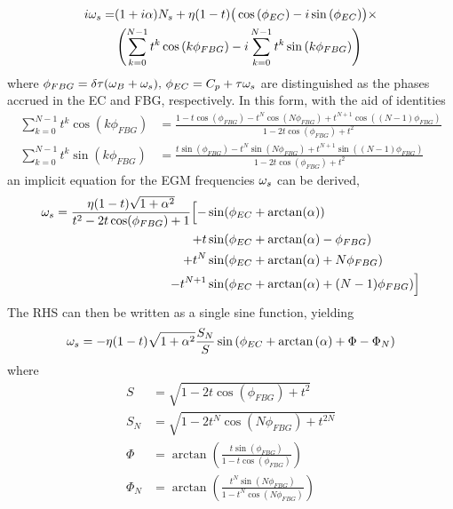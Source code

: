 %
\begin{align*}
    i \omega_s = &(1+i \alpha) N_s + \eta (1-t) \big(\cos{(\phi_{EC})} -i\sin{(\phi_{EC})}  \big) \times \\ 
             &\left( \sum_{k=0}^{N-1} t^k \cos{(k\phi_{FBG})} - i \sum_{k=0}^{N-1} t^k \sin{(k\phi_{FBG})} \right)
\end{align*}
%
where $\phi_{FBG} = \delta \tau(\omega_B + \omega_s), \, \phi_{EC} = C_p+\tau \omega_s$ are distinguished as the phases accrued in the EC and FBG, respectively. In this form, with the aid of identities
%
\begin{align*}
    \sum_{k=0}^{N-1} t^k \cos(k\phi_{FBG}) &= \frac{1 - t \cos(\phi_{FBG}) - t^N \cos(N\phi_{FBG}) + t^{N+1} \cos((N-1)\phi_{FBG})}{1 - 2t \cos(\phi_{FBG}) + t^2} \\
    \sum_{k=0}^{N-1} t^k \sin(k\phi_{FBG}) &= \frac{t \sin(\phi_{FBG}) - t^N \sin(N\phi_{FBG}) + t^{N+1} \sin((N-1)\phi_{FBG})}{1 - 2t \cos(\phi_{FBG}) + t^2}
\end{align*}
%
an implicit equation for the EGM frequencies $\omega_s$ can be derived,
%
\begin{gather*}
    \begin{aligned}
\omega_s = \frac{\eta (1-t) \sqrt{1 + \alpha^2}}{t^2 - 2 t  \cos(\phi_{FBG}) + 1} \Big[ - &\sin(\phi_{EC} + \arctan(\alpha)) \\
     +  t&\sin(\phi_{EC} + \arctan(\alpha) - \phi_{FBG}) \\
     + t^N&\sin(\phi_{EC} + \arctan(\alpha) + N \phi_{FBG})   \\
     -  t^{N+1}&\sin(\phi_{EC} + \arctan(\alpha) + (N-1) \phi_{FBG})
\Big]
\end{aligned}
\end{gather*}
%
The RHS can then be written as a single sine function, yielding
%
\begin{equation}
    \label{eq:discretised_ws}
    \omega_s = -\eta (1-t) \sqrt{1+\alpha^2}\frac{S_N}{S} \sin{\left( \phi_{EC}+\arctan{(\alpha) + \Phi - \Phi_N } \right)}
\end{equation}
%
where
%
\begin{align}
    S &= \sqrt{1 - 2 t \cos{(\phi_{FBG}) + t^2}}
    \\
    S_N &= \sqrt{1 - 2 t^N \cos{(N\phi_{FBG}) + t^{2N}}}
    \\
    \Phi &= \arctan{\left( \frac{t \sin{(\phi_{FBG})}}{1 - t \cos{(\phi_{FBG})}} \right)} 
    \\
    \Phi_N &= \arctan{\left( \frac{t^N \sin{(N\phi_{FBG})}}{1 - t^N \cos{(N\phi_{FBG})}} \right)} 
\end{align}
